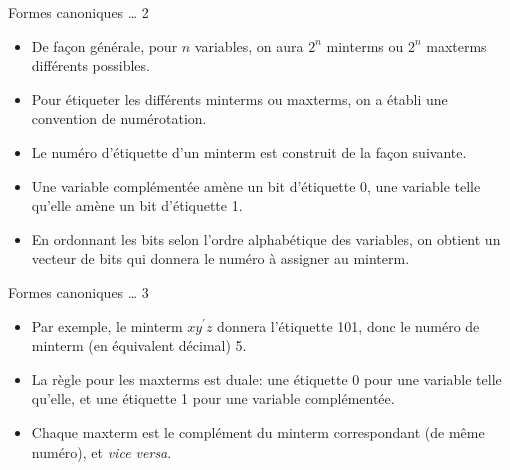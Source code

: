 \documentclass[presentation]{beamer}
\begin{document}
\begin{frame}[label={sec:org74a118f}]{Formes canoniques \ldots{} 2}
\begin{itemize}
\item De façon générale, pour \(n\) variables, on aura \(2^n\) minterms ou \(2^n\) maxterms différents possibles.

\item Pour étiqueter les différents minterms ou maxterms, on a établi une convention de numérotation.

\item Le numéro d'étiquette d'un minterm est construit de la façon suivante.

\item Une variable complémentée amène un bit d'étiquette 0, une variable telle qu'elle amène un bit d'étiquette 1.

\item En ordonnant les bits selon l'ordre alphabétique des variables, on obtient un vecteur de bits qui donnera le numéro à assigner au minterm.
\end{itemize}
\end{frame}

\begin{frame}[label={sec:org7a8bfa6}]{Formes canoniques \ldots{} 3}
\begin{itemize}
\item Par exemple, le minterm \(x y^\prime z\) donnera l'étiquette 101, donc le numéro de minterm (en équivalent décimal) 5.

\item La règle pour les maxterms est duale: une étiquette 0 pour une variable telle qu'elle, et une étiquette 1 pour une variable complémentée.

\item Chaque maxterm est le complément du minterm correspondant (de même numéro), et \emph{vice versa}.
\end{itemize}
\end{frame}
\end{document}

